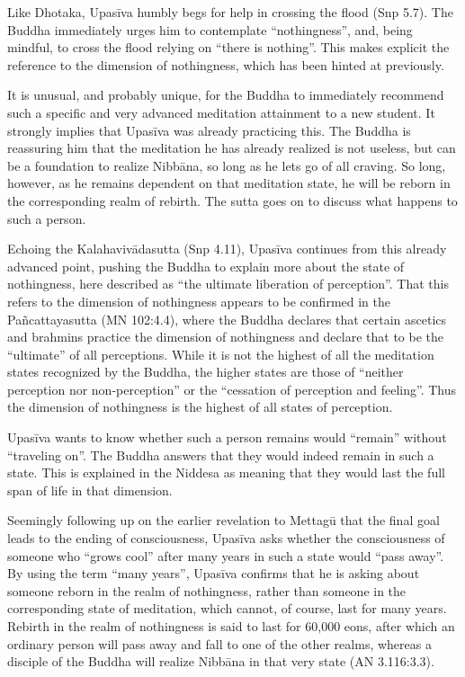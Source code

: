 \documentclass[12pt,openany]{book}%
\begin{document}
Like Dhotaka, \textsanskrit{Upasīva} humbly begs for help in crossing the flood (Snp 5.7). The Buddha immediately urges him to contemplate “nothingness”, and, being mindful, to cross the flood relying on “there is nothing”. This makes explicit the reference to the dimension of nothingness, which has been hinted at previously.

It is unusual, and probably unique, for the Buddha to immediately recommend such a specific and very advanced meditation attainment to a new student. It strongly implies that \textsanskrit{Upasīva} was already practicing this. The Buddha is reassuring him that the meditation he has already realized is not useless, but can be a foundation to realize \textsanskrit{Nibbāna}, so long as he lets go of all craving. So long, however, as he remains dependent on that meditation state, he will be reborn in the corresponding realm of rebirth. The sutta goes on to discuss what happens to such a person.

Echoing the \textsanskrit{Kalahavivādasutta} (Snp 4.11), \textsanskrit{Upasīva} continues from this already advanced point, pushing the Buddha to explain more about the state of nothingness, here described as “the ultimate liberation of perception”. That this refers to the dimension of nothingness appears to be confirmed in the \textsanskrit{Pañcattayasutta} (MN 102:4.4), where the Buddha declares that certain ascetics and brahmins practice the dimension of nothingness and declare that to be the “ultimate” of all perceptions. While it is not the highest of all the meditation states recognized by the Buddha, the higher states are those of “neither perception nor non-perception” or the “cessation of perception and feeling”. Thus the dimension of nothingness is the highest of all states of perception.

\textsanskrit{Upasīva} wants to know whether such a person remains would “remain” without “traveling on”. The Buddha answers that they would indeed remain in such a state. This is explained in the Niddesa as meaning that they would last the full span of life in that dimension.

Seemingly following up on the earlier revelation to \textsanskrit{Mettagū} that the final goal leads to the ending of consciousness, \textsanskrit{Upasīva} asks whether the consciousness of someone who “grows cool” after many years in such a state would “pass away”. By using the term “many years”, \textsanskrit{Upasīva} confirms that he is asking about someone reborn in the realm of nothingness, rather than someone in the corresponding state of meditation, which cannot, of course, last for many years. Rebirth in the realm of nothingness is said to last for 60,000 eons, after which an ordinary person will pass away and fall to one of the other realms, whereas a disciple of the Buddha will realize \textsanskrit{Nibbāna} in that very state (AN 3.116:3.3).
\end{document}
